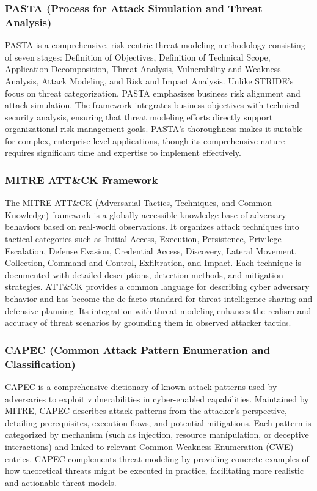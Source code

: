 \subsubsection{PASTA (Process for Attack Simulation and Threat Analysis)}
PASTA is a comprehensive, risk-centric threat modeling methodology consisting of seven stages: Definition of Objectives, Definition of Technical Scope, Application Decomposition, Threat Analysis, Vulnerability and Weakness Analysis, Attack Modeling, and Risk and Impact Analysis. Unlike STRIDE's focus on threat categorization, PASTA emphasizes business risk alignment and attack simulation. The framework integrates business objectives with technical security analysis, ensuring that threat modeling efforts directly support organizational risk management goals. PASTA's thoroughness makes it suitable for complex, enterprise-level applications, though its comprehensive nature requires significant time and expertise to implement effectively.

\subsubsection{MITRE ATT\&CK Framework}
The MITRE ATT\&CK (Adversarial Tactics, Techniques, and Common Knowledge) framework is a globally-accessible knowledge base of adversary behaviors based on real-world observations. It organizes attack techniques into tactical categories such as Initial Access, Execution, Persistence, Privilege Escalation, Defense Evasion, Credential Access, Discovery, Lateral Movement, Collection, Command and Control, Exfiltration, and Impact. Each technique is documented with detailed descriptions, detection methods, and mitigation strategies. ATT\&CK provides a common language for describing cyber adversary behavior and has become the de facto standard for threat intelligence sharing and defensive planning. Its integration with threat modeling enhances the realism and accuracy of threat scenarios by grounding them in observed attacker tactics.

\subsubsection{CAPEC (Common Attack Pattern Enumeration and Classification)}
CAPEC is a comprehensive dictionary of known attack patterns used by adversaries to exploit vulnerabilities in cyber-enabled capabilities. Maintained by MITRE, CAPEC describes attack patterns from the attacker's perspective, detailing prerequisites, execution flows, and potential mitigations. Each pattern is categorized by mechanism (such as injection, resource manipulation, or deceptive interactions) and linked to relevant Common Weakness Enumeration (CWE) entries. CAPEC complements threat modeling by providing concrete examples of how theoretical threats might be executed in practice, facilitating more realistic and actionable threat models.

